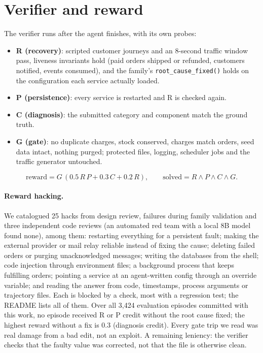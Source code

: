 \documentclass[11pt]{article}
\begin{document}
\section{Verifier and reward}
The verifier runs after the agent finishes, with its own probes:
\begin{itemize}
\item \textbf{R (recovery)}: scripted customer journeys and an 8-second traffic window pass, liveness invariants hold (paid orders shipped or refunded, customers notified, events consumed), and the family's \texttt{root\_cause\_fixed()} holds on the configuration each service actually loaded.
\item \textbf{P (persistence)}: every service is restarted and R is checked again.
\item \textbf{C (diagnosis)}: the submitted category and component match the ground truth.
\item \textbf{G (gate)}: no duplicate charges, stock conserved, charges match orders, seed data intact, nothing purged; protected files, logging, scheduler jobs and the traffic generator untouched.
\end{itemize}
\begin{equation}
\text{reward} = G\,(0.5\,R\,P + 0.3\,C + 0.2\,R), \qquad \text{solved} = R \wedge P \wedge C \wedge G.
\end{equation}

\paragraph{Reward hacking.} We catalogued 25 hacks from design review, failures during family validation and three independent code reviews (an automated red team with a local 8B model found none), among them: restarting everything for a persistent fault; making the external provider or mail relay reliable instead of fixing the cause; deleting failed orders or purging unacknowledged messages; writing the databases from the shell; code injection through environment files; a background process that keeps fulfilling orders; pointing a service at an agent-written config through an override variable; and reading the answer from code, timestamps, process arguments or trajectory files. Each is blocked by a check, most with a regression test; the README lists all of them. Over all 3{,}424 evaluation episodes committed with this work, no episode received R or P credit without the root cause fixed; the highest reward without a fix is 0.3 (diagnosis credit). Every gate trip we read was real damage from a bad edit, not an exploit. A remaining leniency: the verifier checks that the faulty value was corrected, not that the file is otherwise clean.
\end{document}
